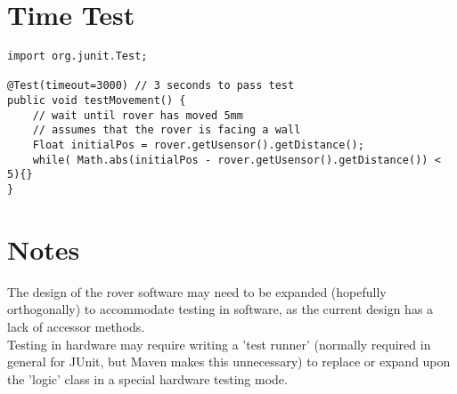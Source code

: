 \documentclass[11pt, a4paper]{article}
\begin{document}
\section{Time Test}
	\begin{lstlisting}
import org.junit.Test;

@Test(timeout=3000) // 3 seconds to pass test
public void testMovement() {
	// wait until rover has moved 5mm
	// assumes that the rover is facing a wall
	Float initialPos = rover.getUsensor().getDistance();
	while( Math.abs(initialPos - rover.getUsensor().getDistance()) < 5){}
}
	\end{lstlisting}
	
\section{Notes}
	The design of the rover software may need to be expanded (hopefully orthogonally) to accommodate testing in software, as the current design has a lack of accessor methods.\\
	Testing in hardware may require writing a 'test runner' (normally required in general for JUnit, but Maven makes this unnecessary) to replace or expand upon the 'logic' class in a special hardware testing mode.
\end{document}

